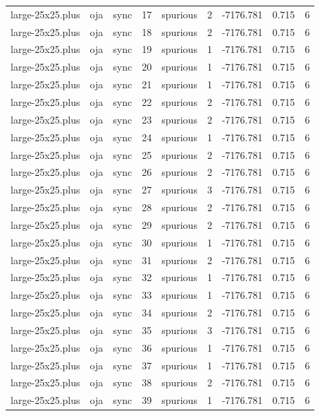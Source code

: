 \begin{tabular}{lllrlrrrr}
large-25x25.plus & oja & sync & 17 & spurious & 2 & -7176.781 & 0.715 & 6 \\
large-25x25.plus & oja & sync & 18 & spurious & 2 & -7176.781 & 0.715 & 6 \\
large-25x25.plus & oja & sync & 19 & spurious & 1 & -7176.781 & 0.715 & 6 \\
large-25x25.plus & oja & sync & 20 & spurious & 1 & -7176.781 & 0.715 & 6 \\
large-25x25.plus & oja & sync & 21 & spurious & 1 & -7176.781 & 0.715 & 6 \\
large-25x25.plus & oja & sync & 22 & spurious & 2 & -7176.781 & 0.715 & 6 \\
large-25x25.plus & oja & sync & 23 & spurious & 2 & -7176.781 & 0.715 & 6 \\
large-25x25.plus & oja & sync & 24 & spurious & 1 & -7176.781 & 0.715 & 6 \\
large-25x25.plus & oja & sync & 25 & spurious & 2 & -7176.781 & 0.715 & 6 \\
large-25x25.plus & oja & sync & 26 & spurious & 2 & -7176.781 & 0.715 & 6 \\
large-25x25.plus & oja & sync & 27 & spurious & 3 & -7176.781 & 0.715 & 6 \\
large-25x25.plus & oja & sync & 28 & spurious & 2 & -7176.781 & 0.715 & 6 \\
large-25x25.plus & oja & sync & 29 & spurious & 2 & -7176.781 & 0.715 & 6 \\
large-25x25.plus & oja & sync & 30 & spurious & 1 & -7176.781 & 0.715 & 6 \\
large-25x25.plus & oja & sync & 31 & spurious & 2 & -7176.781 & 0.715 & 6 \\
large-25x25.plus & oja & sync & 32 & spurious & 1 & -7176.781 & 0.715 & 6 \\
large-25x25.plus & oja & sync & 33 & spurious & 1 & -7176.781 & 0.715 & 6 \\
large-25x25.plus & oja & sync & 34 & spurious & 2 & -7176.781 & 0.715 & 6 \\
large-25x25.plus & oja & sync & 35 & spurious & 3 & -7176.781 & 0.715 & 6 \\
large-25x25.plus & oja & sync & 36 & spurious & 1 & -7176.781 & 0.715 & 6 \\
large-25x25.plus & oja & sync & 37 & spurious & 1 & -7176.781 & 0.715 & 6 \\
large-25x25.plus & oja & sync & 38 & spurious & 2 & -7176.781 & 0.715 & 6 \\
large-25x25.plus & oja & sync & 39 & spurious & 1 & -7176.781 & 0.715 & 6 \\

\end{tabular}
